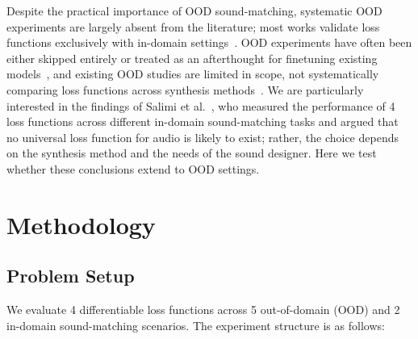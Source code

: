 \documentclass{article}
\newcommand{\anon}[1]{{#1}}
\begin{document}
Despite the practical importance of OOD sound-matching, systematic OOD experiments are largely absent from the literature; most works validate loss functions exclusively with in-domain settings~\cite{horner1993machine,mitchell2007evolutionary,yee2018automatic,han2023perceptual,vahidi2023mesostructures,barkan2019inversynth}. OOD experiments have often been either skipped entirely or treated as an afterthought for finetuning existing models~\cite{masuda2021soundmatch,uzrad2024diffmoog}, and existing OOD studies are limited in scope, not systematically comparing loss functions across synthesis methods~\cite{creativecherep2024,salimi2025evaluating}. We are particularly interested in the findings of \anon{Salimi et al.}~\cite{salimi2025evaluating}, who measured the performance of 4 loss functions across different in-domain sound-matching tasks and argued that no universal loss function for audio is likely to exist; rather, the choice depends on the synthesis method and the needs of the sound designer. Here we test whether these conclusions extend to OOD settings.

\section{Methodology}
\label{sec:methodology}
\subsection{Problem Setup}
We evaluate 4 differentiable loss functions across 5 out-of-domain (OOD) and 2 in-domain sound-matching scenarios. The experiment structure is as follows:
\end{document}
